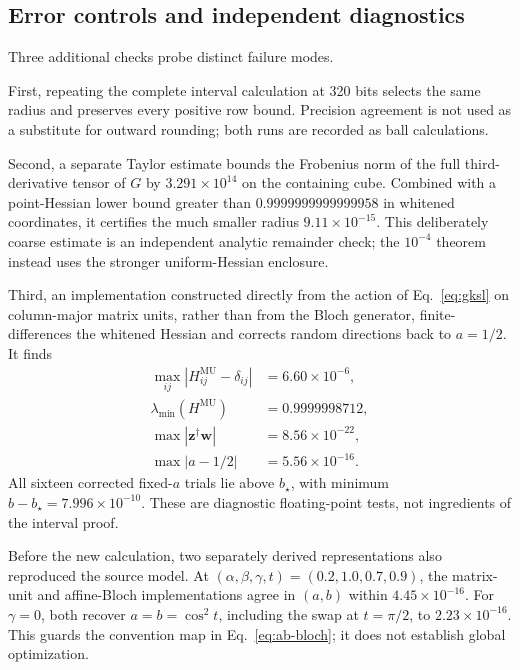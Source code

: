 \documentclass[11pt,a4paper]{article}
\begin{document}
\subsection{Error controls and independent diagnostics}

Three additional checks probe distinct failure modes.

First, repeating the complete interval calculation at 320 bits selects the
same radius and preserves every positive row bound.  Precision agreement is
not used as a substitute for outward rounding; both runs are recorded as ball
calculations.

Second, a separate Taylor estimate bounds the Frobenius norm of the full
third-derivative tensor of $G$ by
$3.291\times10^{14}$ on the containing cube.  Combined with a point-Hessian
lower bound greater than $0.9999999999999958$ in whitened coordinates, it
certifies the much smaller radius $9.11\times10^{-15}$.  This deliberately
coarse estimate is an independent analytic remainder check; the
$10^{-4}$ theorem instead uses the stronger uniform-Hessian enclosure.

Third, an implementation constructed directly from the action of
Eq.~\eqref{eq:gksl} on column-major matrix units, rather than from the Bloch
generator, finite-differences the whitened Hessian and corrects random
directions back to $a=1/2$.  It finds
\begin{align}
 \max_{ij}|H^{\mathrm{MU}}_{ij}-\delta_{ij}|&=6.60\times10^{-6},\nonumber\\
 \lambda_{\min}(H^{\mathrm{MU}})&=0.9999998712,\nonumber\\
 \max|\bm z^\dagger\bm w|&=8.56\times10^{-22},\nonumber\\
 \max|a-1/2|&=5.56\times10^{-16}.
 \label{eq:independent-checks}
\end{align}
All sixteen corrected fixed-$a$ trials lie above $b_\star$, with minimum
$b-b_\star=7.996\times10^{-10}$.  These are diagnostic floating-point tests,
not ingredients of the interval proof.

Before the new calculation, two separately derived representations also
reproduced the source model.  At
$(\alpha,\beta,\gamma,t)=(0.2,1.0,0.7,0.9)$, the matrix-unit and affine-Bloch
implementations agree in $(a,b)$ within $4.45\times10^{-16}$.  For
$\gamma=0$, both recover $a=b=\cos^2t$, including the swap at $t=\pi/2$, to
$2.23\times10^{-16}$.  This guards the convention map in
Eq.~\eqref{eq:ab-bloch}; it does not establish global optimization.
\end{document}
